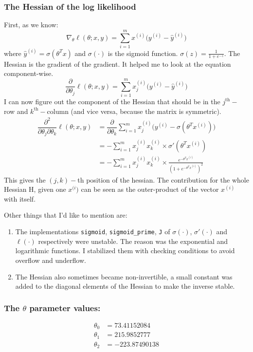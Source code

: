 \documentclass[11pt]{article}
\begin{document}
\subsubsection{The Hessian of the log likelihood}
\label{sec:org52789f5}
First, as we know:
\begin{equation*}
\nabla_\theta\ell(\theta;x,y)=\sum_{i=1}^m x^{(i)}\bigl(y^{(i)} - \hat{y}^{(i)}\bigr)
\end{equation*}
where \(\hat{y}^{(i)}=\sigma(\theta^Tx)\) and \(\sigma(\cdot)\) is the
sigmoid
function. \(\displaystyle\sigma(z)=\frac{1}{1+e^{-z}}\). The
Hessian is the gradient of the gradient. It helped me to look at the
equation component-wise.
\begin{equation*}
\dfrac{\partial}{\partial\theta_j}\ell(\theta;x,y)=\sum_{i=1}^m x_j^{(i)}\bigl(y^{(i)} - \hat{y}^{(i)}\bigr)
\end{equation*}
I can now figure out the component of the Hessian that should be in the
\(j^{\mathrm{th}}-\)row and \(k^{\mathrm{th}}-\)column (and vice versa,
because the matrix is symmetric).
\begin{align*}
\dfrac{\partial^2}{\partial\theta_j\partial\theta_k}\ell(\theta;x,y)&=\dfrac{\partial}{\partial\theta_k}\sum_{i=1}^m x_j^{(i)}\bigl(y^{(i)} - \sigma(\theta^Tx^{(i)})\bigr)\\
&=-\sum_{i=1}^m x_j^{(i)}x_k^{(i)}\times\sigma'(\theta^Tx^{(i)})\\
&=-\sum_{i=1}^m x_j^{(i)}x_k^{(i)}\times\frac{e^{-\theta^Tx^{(i)}}}{(1+e^{-\theta^Tx^{(i)}})^2}
\end{align*}
This gives the \((j,k)-\)th position of the hessian. The contribution
for the whole Hessian H, given one \(x^{(i})\) can be seen as the
outer-product of the vector \(x^{(i)}\) with itself.\par
Other things that I'd like to mention are:
\begin{enumerate}
\item The implementations \texttt{sigmoid}, \texttt{sigmoid\_prime},
\texttt{J} of \(\sigma(\cdot)\), \(\sigma'(\cdot)\) and
\(\ell(\cdot)\) respectively were unstable. The reason was the
exponential and logarithmic functions. I stabilized them
with checking conditions to avoid overflow and underflow.
\item The Hessian also sometimes became non-invertible, a small
constant was added to the diagonal elements of the Hessian to
make the inverse stable.
\end{enumerate}
\subsubsection{The \(\theta\) parameter values:}
\label{sec:org3f62dae}
\begin{align*}
\theta_0 &=73.41152084\\
\theta_1 &=215.9852777\\
\theta_2 &=-223.87490138
\end{align*}
\end{document}
